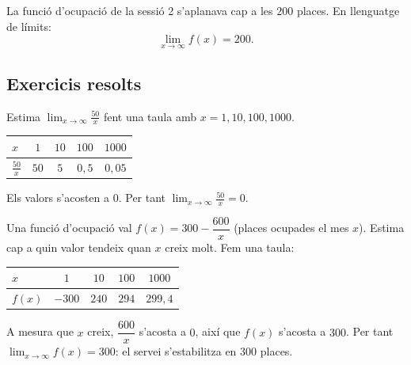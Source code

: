 \begin{exemple}
La funció d'ocupació de la sessió 2 s'aplanava cap a les $200$ places. En llenguatge
de límits:
\[
\lim_{x\to\infty} f(x)=200.
\]

\begin{center}

\end{center}
\end{exemple}

\subsection{Exercicis resolts}

\begin{exresolt}
Estima $\displaystyle\lim_{x\to\infty}\frac{50}{x}$ fent una taula amb $x=1,10,100,1000$.
\solucio
\begin{center}
\begin{tabular}{lcccc}
\toprule
$x$ & $1$ & $10$ & $100$ & $\num{1000}$ \\
\midrule
$\frac{50}{x}$ & $50$ & $5$ & $0,5$ & $0,05$ \\
\bottomrule
\end{tabular}
\end{center}
Els valors s'acosten a $0$. Per tant $\displaystyle\lim_{x\to\infty}\frac{50}{x}=0$.
\end{exresolt}

\begin{exresolt}
Una funció d'ocupació val $f(x)=300-\dfrac{600}{x}$ (places ocupades el mes $x$).
Estima cap a quin valor tendeix quan $x$ creix molt.
\solucio
Fem una taula:
\begin{center}
\begin{tabular}{lcccc}
\toprule
$x$ & $1$ & $10$ & $100$ & $\num{1000}$ \\
\midrule
$f(x)$ & $-300$ & $240$ & $294$ & $299,4$ \\
\bottomrule
\end{tabular}
\end{center}
A mesura que $x$ creix, $\dfrac{600}{x}$ s'acosta a $0$, així que $f(x)$ s'acosta a
$300$. Per tant $\displaystyle\lim_{x\to\infty}f(x)=300$: el servei s'estabilitza en
$300$ places.
\end{exresolt}

